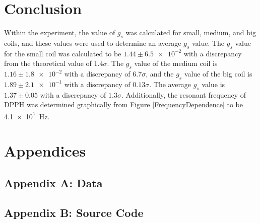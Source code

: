 \documentclass[a4paper]{article}
\begin{document}
\section{Conclusion}
\qq Within the experiment, the value of \( g_s \) was calculated for small,
medium, and big coils, and these values were used to determine an average
\( g_s \) value. The \( g_s \) value for the small coil was calculated to be
\( 1.44 \pm \num{6.5e-2} \) with a discrepancy from the theoretical value of
\( 1.4 \sigma \). The \( g_s \) value of the medium coil is
\( 1.16 \pm \num{1.8e-2} \) with a discrepancy of \( 6.7 \sigma \), and the
\( g_s \) value of the big coil is \( 1.89 \pm \num{2.1e-1} \) with a
discrepancy of \( 0.13 \sigma \). The average \( g_s \) value is
\( 1.37 \pm 0.05 \) with a discrepancy of \( 1.3 \sigma \). Additionally, the
resonant frequency of DPPH was determined graphically from Figure
\ref{FrequencyDependence} to be \SI{4.1e7}{\hertz}.

\section{Appendices}

\subsection{Appendix A: Data}

\subsection{Appendix B: Source Code}
\end{document}
